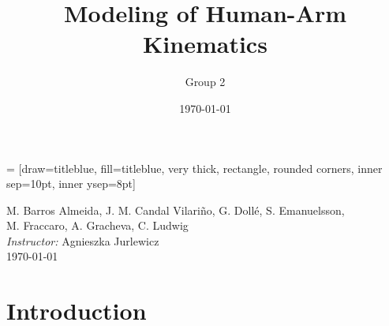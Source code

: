 \documentclass{beamer}
\title[Kinematics of Human-Arm]{Modeling of Human-Arm Kinematics} %
\author{
Group 2
\vspace{2mm}
}
\institute[ESSIM2013] %
{
\medskip
}
\date{\today} %
\begin{document}
 = [draw=titleblue, fill=titleblue, very thick,
    rectangle, rounded corners, inner sep=10pt, inner ysep=8pt]

\begin{frame}
\vspace{5mm}
\hspace{5mm}
\begin{center}
M. Barros Almeida,
J. M. Candal Vilari\~{n}o,
G. Doll\'{e},
S. Emanuelsson,\\\vspace{1mm}
M. Fraccaro,
A. Gracheva,
C. Ludwig
\\\vspace{5mm}
\textit{ Instructor:}
Agnieszka Jurlewicz
\\\vspace{5mm}
\today
\end{center}
\end{frame}



\section{Introduction}
\end{document}
